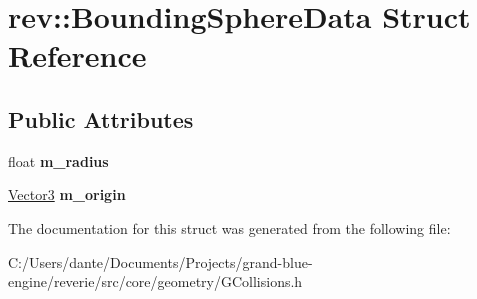 \hypertarget{structrev_1_1_bounding_sphere_data}{}\section{rev\+::Bounding\+Sphere\+Data Struct Reference}
\label{structrev_1_1_bounding_sphere_data}
\subsection*{Public Attributes}
\begin{DoxyCompactItemize}
\item 
\mbox{\label{structrev_1_1_bounding_sphere_data_afe8aae649326ebae2c1aabb1659b6d17}} 
float {\bfseries m\+\_\+radius}
\item 
\mbox{\label{structrev_1_1_bounding_sphere_data_aa980b67e575996251c74785efe8be764}} 
\mbox{\hyperlink{classrev_1_1_vector}{Vector3}} {\bfseries m\+\_\+origin}
\end{DoxyCompactItemize}


The documentation for this struct was generated from the following file\+:\begin{DoxyCompactItemize}
\item 
C\+:/\+Users/dante/\+Documents/\+Projects/grand-\/blue-\/engine/reverie/src/core/geometry/G\+Collisions.\+h\end{DoxyCompactItemize}
